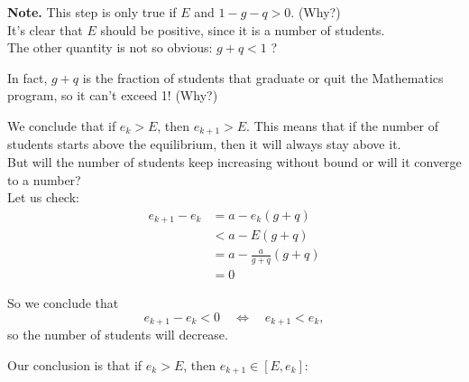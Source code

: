 \begin{graybox}
\textbf{Note. } This step is only true if $E$ and $1-g-q>0$. (Why?) \\

It's clear that $E$ should be positive, since it is a number of students. \\

The other quantity is not so obvious: \quad $g+q < 1$ ?

In fact, $g+q$ is the fraction of students that graduate or quit the Mathematics program, so it can't exceed 1! (Why?)
\end{graybox}


We conclude that if $e_k > E$, then $e_{k+1}>E$. This means that if the number of students starts above the equilibrium, then it will always stay above it.\\

But will the number of students keep increasing without bound or will it converge to a number?\\

Let us check:
\begin{align*}
e_{k+1} - e_k
	& = a - e_k (g+q) \\
	& < a - E (g+q) \\
	& = a - \frac{a}{g+q} (g+q) \\
	& = 0
\end{align*}

So we conclude that 
$$
e_{k+1} - e_k < 0 \quad \Leftrightarrow \quad e_{k+1} < e_k,
$$
so the number of students will decrease.

Our conclusion is that if $e_k > E$, then $e_{k+1} \in [E, e_k]$:
\begin{center}
\end{center}


